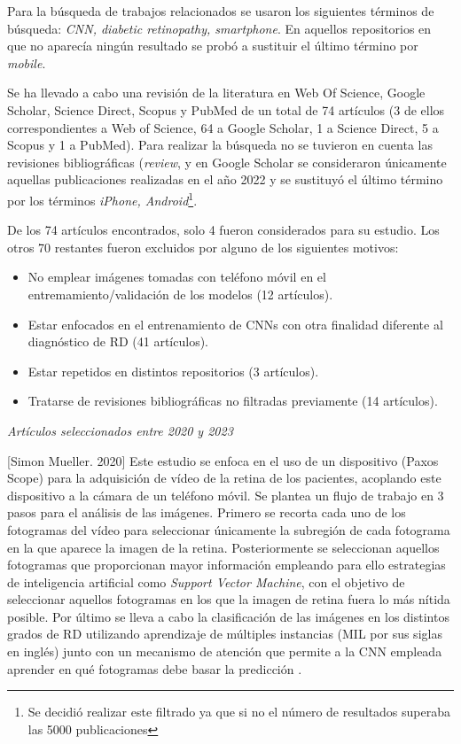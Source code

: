 Para la búsqueda de trabajos relacionados se usaron los siguientes términos de búsqueda: \textit{CNN, diabetic retinopathy, smartphone}. En aquellos repositorios en que no aparecía ningún resultado se probó a sustituir el último término por \textit{mobile}.

Se ha llevado a cabo una revisión de la literatura en Web Of Science, Google Scholar, Science Direct, Scopus y PubMed de un total de 74 artículos (3 de ellos correspondientes a Web of Science, 64 a Google Scholar, 1 a Science Direct, 5 a Scopus y 1 a PubMed). Para realizar la búsqueda no se tuvieron en cuenta las revisiones bibliográficas (\textit{review}, y en Google Scholar se consideraron únicamente aquellas publicaciones realizadas en el año 2022 y se sustituyó el último término por los términos \textit{iPhone, Android}\footnote{Se decidió realizar este filtrado ya que si no el número de resultados superaba las 5000 publicaciones}.

De los 74 artículos encontrados, solo 4 fueron considerados para su estudio. Los otros 70 restantes fueron excluidos por alguno de los siguientes motivos:

\begin{itemize} [itemsep=0.25em]
    \item No emplear imágenes tomadas con teléfono móvil en el entremamiento/validación de los modelos (12 artículos).
    \item Estar enfocados en el entrenamiento de CNNs con otra finalidad diferente al diagnóstico de RD (41 artículos).
    \item Estar repetidos en distintos repositorios (3 artículos).
    \item Tratarse de revisiones bibliográficas no filtradas previamente (14 artículos).
\end{itemize}

\textit{Artículos seleccionados entre 2020 y 2023}

[Simon Mueller. 2020] Este estudio se enfoca en el uso de un dispositivo (Paxos Scope) para la adquisición de vídeo de la retina de los pacientes, acoplando este dispositivo a la cámara de un teléfono móvil. Se plantea un flujo de trabajo en 3 pasos para el análisis de las imágenes. Primero se recorta cada uno de los fotogramas del vídeo para seleccionar únicamente la subregión de cada fotograma en la que aparece la imagen de la retina. Posteriormente se seleccionan aquellos fotogramas que proporcionan mayor información empleando para ello estrategias de inteligencia artificial como \textit{Support Vector Machine}, con el objetivo de seleccionar aquellos fotogramas en los que la imagen de retina fuera lo más nítida posible. Por último se lleva a cabo la clasificación de las imágenes en los distintos grados de RD utilizando aprendizaje de múltiples instancias (MIL por sus siglas en inglés) junto con un mecanismo de atención que permite a la CNN empleada aprender en qué fotogramas debe basar la predicción \cite{soa:mueller}. 

